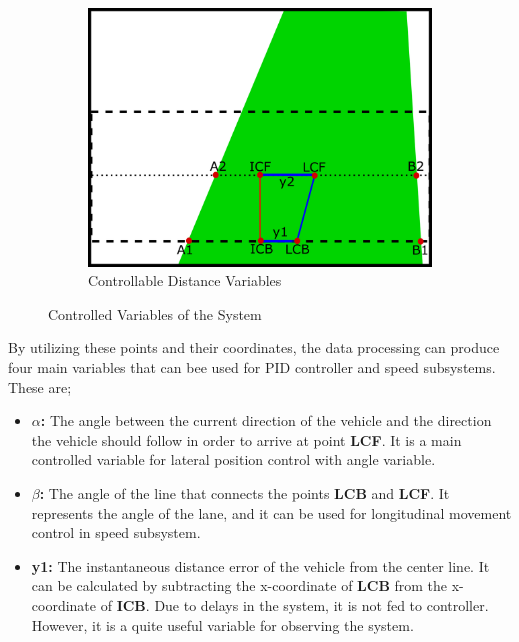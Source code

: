 \documentclass[a4paper,12pt]{article}
\begin{document}
\begin{itemize}[A.]
\begin{figure}[H]
\begin{subfigure}{.46\textwidth}
\includegraphics[width=0.45\unitlength]{images/dist_cont}

\caption{\label{fig:dist-cont} Controllable Distance Variables}

\end{subfigure}

\caption{\label{fig:controlled-vars} Controlled Variables of the System }

\end{figure}




By utilizing these points and their coordinates, the data processing can produce four main variables that can bee used for PID controller and speed subsystems. These are;


\begin{itemize}

\item \textbf{$\alpha$:} The angle between the current direction of the vehicle and the direction the vehicle should follow in order to arrive at point \textbf{LCF}. It is a main controlled variable for lateral position control with angle variable.


\item \textbf{$\beta$:} The angle of the line that connects the points \textbf{LCB} and \textbf{LCF}. It represents the angle of the lane, and it can be used for longitudinal movement control in speed subsystem.


\item \textbf{y1:} The instantaneous distance error of the vehicle from the center line. It can be calculated by subtracting the x-coordinate of \textbf{LCB} from the x-coordinate of \textbf{ICB}. Due to delays in the system, it is not fed to controller. However, it is a quite useful variable for observing the system.  



\end{itemize}
\end{itemize}
\end{document}
